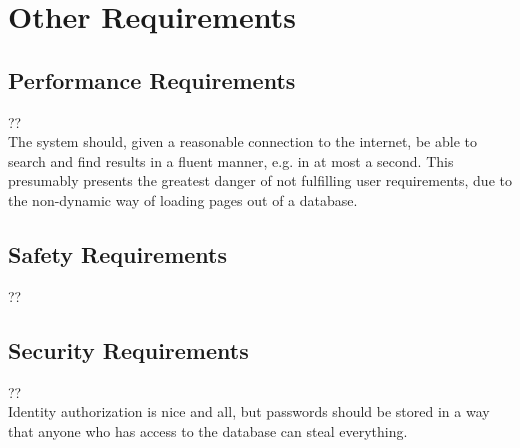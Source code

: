 \section{Other Requirements}
\subsection{Performance Requirements}
	?? \\
	The system should, given a reasonable connection to the internet, be
	able to search and find results in a fluent manner, e.g. in at most a
	second. This presumably presents the greatest danger of not fulfilling
	user requirements, due to the non-dynamic way of loading pages out of a
	database.
	
\subsection{Safety Requirements}
	??
	
\subsection{Security Requirements}
	?? \\
	Identity authorization is nice and all, but passwords should be stored
	in a way that anyone who has access to the database can steal everything.
